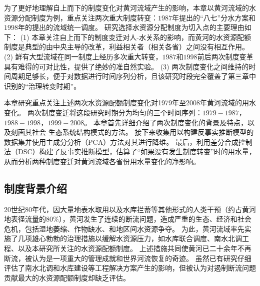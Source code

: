 
为了更好地理解自上而下的制度变化对黄河流域产生的影响，本章以黄河流域的水资源分配制度为例，重点关注两次重大制度转变：$1987$年提出的“八七”分水方案和$1998$年的提出的流域统一调度。
研究选择水资源分配制度为切入点的主要理由如下：
(1) 本章关注自上而下的制度变迁对人-水关系的影响，而黄河的水资源配额制度是典型的由中央主导的改革，利益相关者（相关各省）之间没有相互作用。
(2) 鲜有大型流域在同一制度上经历多次重大转变，$1987$和$1998$前后两次制度变革具有难得的可对比性，提供了绝妙的准自然实验。
(3) 两次制度变化之间维持的时间周期足够长，便于对数据进行时间序列分析，且该研究时段完全覆盖了第三章中识别的“治理转变时期”。

本章研究重点关注上述两次水资源配额制度变化对1979年至2008年黄河流域的用水变化。
两次制度变迁将这段研究时期分为均匀的三个时间序列：$1979-1987$，$1988-1998$，$1999-2008$。
本章首先详细介绍了两次制度变化的背景及特点，以及刻画其社会-生态系统结构模式的方法。
接下来收集用以构建反事实推断模型的数据集并使用主成分分析（PCA）方法对其进行降维。
最后，利用差分合成控制法（DSC）构建了反事实推断模型\cite{arkhangelsky2021}，估算了“如果没有发生制度转变”时的用水量，从而分析两种制度变迁对黄河流域各省份用水量变化的净影响。

\subsection{制度背景介绍}\label{sec:yrb}

20世纪80年代，因大量地表水取用以及水库拦蓄等其他形式的人类干预（约占黄河地表径流量的$80\%$），黄河发生了连续的断流问题，造成严重的生态、经济和社会危机，包括湿地萎缩、作物缺水、和地区间水资源争夺。 %
为此，黄河流域率先实施了几项雄心勃勃的治理措施以缓解水资源压力，如水库联合调度、南水北调工程、以及本研究所关注的水资源配额制度\cite{long2020, wang2019d}。
上述措施共同使黄河已二十余年不再断流，被认为是一项重大的管理成就和世界河流恢复的奇迹。
虽然已有研究仔细评估了南水北调和水库建设等工程解决方案产生的影响\cite{long2020,wang2019c}，但被认为对遏制断流问题贡献最大的水资源配额制度却缺乏评估\cite{wang2019b}。


